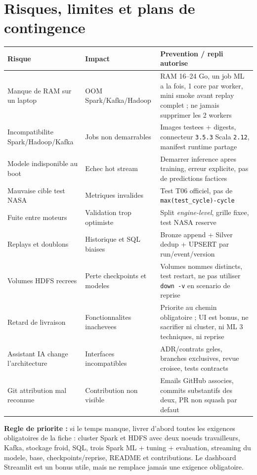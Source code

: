\documentclass[10pt,a4paper]{article}
\newcommand{\code}[1]{{\small\ttfamily\nolinkurl{#1}}}
\begin{document}
\section{Risques, limites et plans de contingence}
\begin{longtable}{@{}p{40mm}p{50mm}p{59mm}@{}}
\toprule
\textbf{Risque} & \textbf{Impact} & \textbf{Prevention / repli autorise}\\\midrule
\endhead
Manque de RAM sur un laptop & OOM Spark/Kafka/Hadoop & RAM 16--24 Go, un job ML a la fois, 1 core par worker, mini smoke avant replay complet ; ne jamais supprimer les 2 workers\\
Incompatibilite Spark/Hadoop/Kafka & Jobs non demarrables & Images testees + digests, connecteur \code{3.5.3} Scala \code{2.12}, manifest runtime partage\\
Modele indisponible au boot & Echec hot stream & Demarrer inference apres training, erreur explicite, pas de predictions factices\\
Mauvaise cible test NASA & Metriques invalides & Test T06 officiel, pas de \code{max(test_cycle)-cycle}\\
Fuite entre moteurs & Validation trop optimiste & Split \emph{engine-level}, grille fixee, test NASA reserve\\
Replays et doublons & Historique et SQL biaises & Bronze append + Silver dedup + UPSERT par run/event/version\\
Volumes HDFS recrees & Perte checkpoints et modeles & Volumes nommes distincts, test restart, ne pas utiliser \code{down -v} en scenario de reprise\\
Retard de livraison & Fonctionnalites inachevees & Priorite au chemin obligatoire ; UI est bonus, ne sacrifier ni cluster, ni ML 3 techniques, ni reprise\\
Assistant IA change l'architecture & Interfaces incompatibles & ADR/contrats geles, branches exclusives, revue croisee, tests contracts\\
Git attribution mal reconnue & Contribution non visible & Emails GitHub associes, commits substantifs des deux, PR non squash par defaut\\
\bottomrule
\end{longtable}
\begin{successbox}
\textbf{Regle de priorite :} si le temps manque, livrer d'abord toutes les exigences obligatoires de la fiche : cluster Spark et HDFS avec deux noeuds travailleurs, Kafka, stockage froid, SQL, trois Spark ML + tuning + evaluation, streaming du modele, base, checkpoints/reprise, README et contributions. Le dashboard Streamlit est un bonus utile, mais ne remplace jamais une exigence obligatoire.
\end{successbox}
\end{document}
